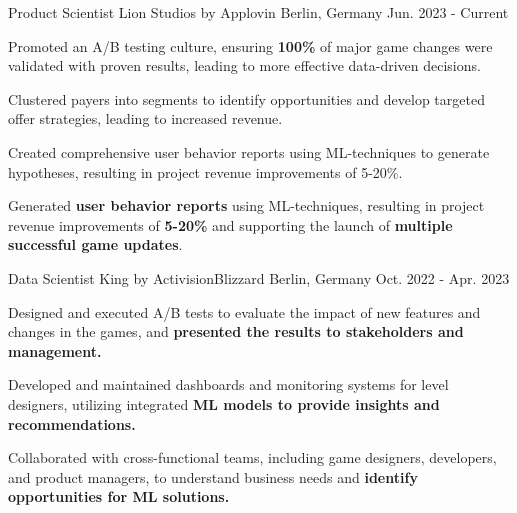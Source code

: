 

\begin{cventries}

\cventry
  {Product Scientist} %
  {Lion Studios by Applovin} %
  {Berlin, Germany} %
  {Jun. 2023 - Current} %
  {
    \begin{cvitems} %
      \item {Promoted an A/B testing culture, ensuring \textbf{100\%} of major game changes were validated with proven results, leading to more effective data-driven decisions.}
      \item {Clustered payers into segments to identify opportunities and develop targeted offer strategies, leading to increased revenue.}
      \item {Created comprehensive user behavior reports using ML-techniques to generate hypotheses, resulting in project revenue improvements of 5-20\%.}
      \item {Generated \textbf{user behavior reports} using ML-techniques, resulting in project revenue improvements of \textbf{5-20\%} and supporting the launch of \textbf{multiple successful game updates}.}
    \end{cvitems}
  }

\cventry
  {Data Scientist} %
  {King by ActivisionBlizzard} %
  {Berlin, Germany} %
  {Oct. 2022 - Apr. 2023} %
  {
    \begin{cvitems} %
      \item {Designed and executed  A/B tests to evaluate the impact of new features and changes in the games, and \textbf{presented the results to stakeholders and management.}}
      \item {Developed and maintained dashboards and monitoring systems for level designers, utilizing integrated \textbf{ML models to provide insights and recommendations.}} %
      \item {Collaborated with cross-functional teams, including game designers, developers, and product managers, to understand business needs and \textbf{identify opportunities for ML solutions.}}
    \end{cvitems}
  }



\end{cventries}
